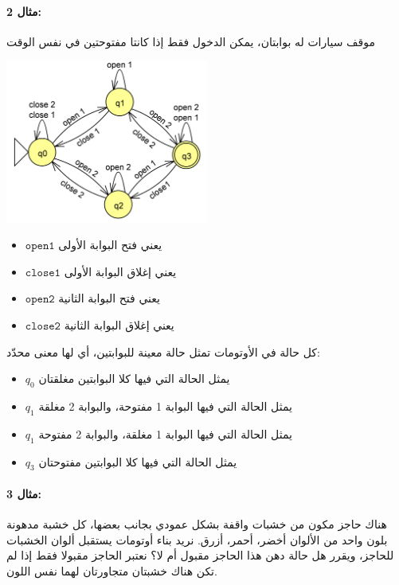 \documentclass[12pt]{article}
\begin{document}
\paragraph{مثال 2:} موقف سيارات له بوابتان، يمكن الدخول فقط إذا كانتا مفتوحتين في نفس الوقت
\begin{center}
\includegraphics[width=0.5\textwidth]{../../../images/DFAs/02_two_gates_to_open_dfa.png}
\end{center}

\begin{itemize}
    \item $\mathtt{open 1}$ يعني فتح البوابة الأولى
    \item $\mathtt{close 1}$ يعني إغلاق البوابة الأولى
    \item $\mathtt{open 2}$ يعني فتح البوابة الثانية
    \item $\mathtt{close 2}$ يعني إغلاق البوابة الثانية
\end{itemize}

كل حالة في الأوتومات تمثل حالة معينة للبوابتين، أي لها معنى محدّد:
\begin{itemize}
    \item $q_0$ يمثل الحالة التي فيها كلا البوابتين مغلقتان
    \item $q_1$ يمثل الحالة التي فيها البوابة 1 مفتوحة، والبوابة 2 مغلقة
    \item $q_1$ يمثل الحالة التي فيها البوابة 1 مغلقة، والبوابة 2 مفتوحة
    \item $q_3$ يمثل الحالة التي فيها كلا البوابتين مفتوحتان
\end{itemize}


\paragraph{مثال 3:} هناك حاجز مكون من خشبات واقفة بشكل عمودي بجانب بعضها، كل خشبة مدهونة بلون واحد من الألوان أخضر، أحمر، أزرق. نريد بناء أوتومات يستقبل ألوان الخشبات للحاجز، ويقرر هل حالة دهن هذا الحاجز مقبول أم لا؟
نعتبر الحاجز مقبولا فقط إذا لم تكن هناك خشبتان متجاورتان لهما نفس اللون.
\end{document}
